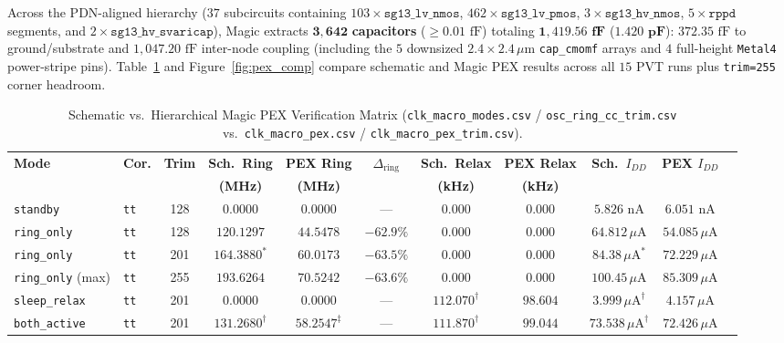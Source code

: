 \documentclass[10pt,a4paper]{article}
\begin{document}
Across the PDN-aligned hierarchy ($37$ subcircuits containing $103\times\texttt{sg13\_lv\_nmos}$, $462\times\texttt{sg13\_lv\_pmos}$, $3\times\texttt{sg13\_hv\_nmos}$, $5\times\texttt{rppd}$ segments, and $2\times\texttt{sg13\_hv\_svaricap}$), Magic extracts $\mathbf{3{,}642}$ \textbf{capacitors} ($\ge 0.01\text{ fF}$) totaling $\mathbf{1{,}419.56\text{ fF}}$ ($\mathbf{1.420\text{ pF}}$): $372.35\text{ fF}$ to ground/substrate and $1{,}047.20\text{ fF}$ inter-node coupling (including the $5$ downsized $2.4\times 2.4\,\mu\text{m}$ \texttt{cap\_cmomf} arrays and $4$ full-height \texttt{Metal4} power-stripe pins). Table~\ref{tab:pex_vs_sch} and Figure~\ref{fig:pex_comp} compare schematic and Magic PEX results across all $15$ PVT runs plus \texttt{trim=255} corner headroom.

\begin{table}[H]
\centering
\caption{Schematic vs.\ Hierarchical Magic PEX Verification Matrix (\texttt{clk\_macro\_modes.csv} / \texttt{osc\_ring\_cc\_trim.csv} vs.\ \texttt{clk\_macro\_pex.csv} / \texttt{clk\_macro\_pex\_trim.csv}).}
\label{tab:pex_vs_sch}
\scriptsize
\setlength{\tabcolsep}{3.0pt}
\begin{tabular}{@{}llccccccccc@{}}
\toprule
\textbf{Mode} & \textbf{Cor.} & \textbf{Trim} & \textbf{Sch.\ Ring} & \textbf{PEX Ring} & \textbf{$\Delta_{\text{ring}}$} & \textbf{Sch.\ Relax} & \textbf{PEX Relax} & \textbf{Sch.\ $I_{DD}$} & \textbf{PEX $I_{DD}$} \\
 & & & \textbf{(MHz)} & \textbf{(MHz)} & & \textbf{(kHz)} & \textbf{(kHz)} & & \\
\midrule
\texttt{standby} & \texttt{tt} & 128 & 0.0000 & 0.0000 & --- & 0.000 & 0.000 & $5.826\text{ nA}$ & $6.051\text{ nA}$ \\
\texttt{ring\_only} & \texttt{tt} & 128 & $120.1297$ & $44.5478$ & $-62.9\%$ & 0.000 & 0.000 & $64.812\,\mu\text{A}$ & $54.085\,\mu\text{A}$ \\
\texttt{ring\_only} & \texttt{tt} & 201 & $164.3880^*$ & $\mathbf{60.0173}$ & $-63.5\%$ & 0.000 & 0.000 & $84.38\,\mu\text{A}^*$ & $72.229\,\mu\text{A}$ \\
\texttt{ring\_only} (max) & \texttt{tt} & 255 & $193.6264$ & $70.5242$ & $-63.6\%$ & 0.000 & 0.000 & $100.45\,\mu\text{A}$ & $85.309\,\mu\text{A}$ \\
\texttt{sleep\_relax} & \texttt{tt} & 201 & 0.0000 & 0.0000 & --- & $112.070^\dagger$ & $\mathbf{98.604}$ & $3.999\,\mu\text{A}^\dagger$ & $4.157\,\mu\text{A}$ \\
\texttt{both\_active} & \texttt{tt} & 201 & $131.2680^\dagger$ & $58.2547^\ddagger$ & --- & $111.870^\dagger$ & $99.044$ & $73.538\,\mu\text{A}^\dagger$ & $72.426\,\mu\text{A}$ \\

\end{tabular}
\end{table}
\end{document}
